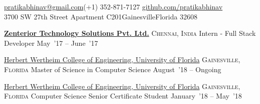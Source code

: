 \documentclass[10pt,a4paper]{article}
\begin{document}
\sloppy  %



\nobreakvspace{0.3em}  %

\noindent\href{mailto:pratikabhinav@gmail.com}{pratikabhinav\mbox{}@\mbox{}gmail.com}\sbull (+1) 352-871-7127 \sbull \href{https://github.com/pratikabhinav}{github.com/pratikabhinav}\\
3700 SW 27th Street\sbull
Apartment C201\sbull Gainesville\sbull Florida 32608
\spacedhrule{0.5em}{-0.4em}


\spacedhrule{0.5em}{-0.4em}

\headedsection  %
  {\href{}{\textbf{Zenterior Technology Solutions Pvt. Ltd.}}}
  {\textsc{Chennai, India}}
  {%
  \headedsubsection
    {Intern - Full Stack Developer}
    {May~'17 -- June~'17}
    {}
}


\headedsection
  {\href{}{Herbert Wertheim College of Engineering, University of Florida}}
  {\textsc{Gainesville, Florida}} {%
  \headedsubsection
    {Master of Science in Computer Science }
    {August~'18 -- Ongoing} {}
}

\headedsection
  {\href{}{Herbert Wertheim College of Engineering, University of Florida}}
  {\textsc{Gainesville, Florida}} {%
  \headedsubsection
    {Computer Science Senior Certificate Student}
    {January~'18 -- May~'18} {}
}
\end{document}
